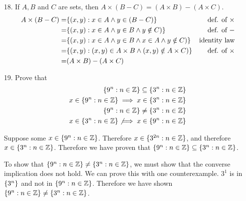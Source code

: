 \documentclass[openany, 12pt]{book}
\begin{document}
\begin{exercise}{}{}
	{18. If $A, B$ and $C$ are sets, then $A \times(B-C)=(A \times B)-(A \times C)$.}
	\begin{align*}
		A\times (B-C) = & \{(x, y): x\in A \land y\in (B-C)\}                             & \text{def. of }\times \\
		=               & \{(x,y): x\in A \land y \in B \land y\notin C)\}                & \text{def. of }-      \\
		=               & \{(x,y): x\in A \land y \in B \land x\in A \land y\notin C)\}   & \text{identity law}   \\
		=               & \{(x,y): (x, y) \in A\times B \land (x, y) \notin A \times C)\} &
		\text{def. of }\times                                                                                       \\
		=               & (A\times B) - (A\times C)
	\end{align*}
\end{exercise}

\begin{exercise}{}{}{19. Prove that}
	\begin{align*}
		\{9^n: n \in \mathbb{Z}\} \subseteq\{3^n: n \in \mathbb{Z}\}          \\
		x\in \{9^n: n \in \mathbb{Z}\} \implies x\in\{3^n: n \in \mathbb{Z}\} \\
		\{9^n: n \in \mathbb{Z}\} \neq\{3^n: n \in \mathbb{Z}\}               \\
		x\in\{3^n: n \in \mathbb{Z}\}
		\not\implies
		x\in \{9^n: n \in \mathbb{Z}\}
	\end{align*}
	\begin{alist}
		\item Suppose some $x\in \{9^n: n\in\mathbb{Z}\}$. Therefore $x\in\{3^{2n}:
				n\in\mathbb{Z}\}$, and therefore $x\in\{3^n: n\in\mathbb{Z}\}$. Therefore
		we have proven that $\{9^n: n \in \mathbb{Z}\} \subseteq\{3^n: n \in \mathbb{Z}\}$.
		\item To show that $\{9^n: n \in \mathbb{Z}\} \neq\{3^n: n \in
				\mathbb{Z}\}$, we must show that the converse implication does not hold. We
		can prove this with one counterexample. $3^1$ is in $\{3^n\}$ and not in
		$\{9^n:n\in\mathbb{Z}\}$. Therefore we have shown
		$\{9^n: n \in \mathbb{Z}\} \neq\{3^n: n \in \mathbb{Z}\}$.
	\end{alist}
\end{exercise}
\end{document}
